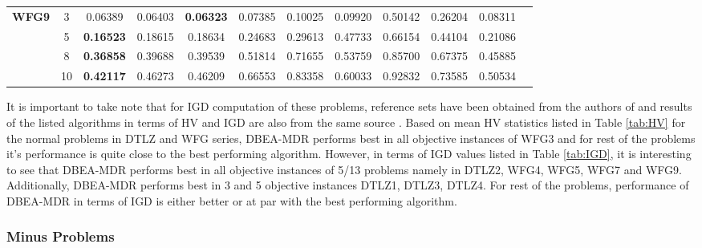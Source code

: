 \documentclass{sig-alternate}
\begin{document}
\begin{table}[!htb]
\begin{tabular}{|c|c|c|c|c|c|c|c|c|c|c|c|}
		\multirow{4}{*}{\textbf{WFG9}}  & 3          & 0.06389          & 0.06403           & \textbf{0.06323}      & 0.07385          & 0.10025             & 0.09920             & 0.50142            & 0.26204              & 0.08311          \\ \cline{2-11} 
		& 5          & \textbf{0.16523} & 0.18615           & 0.18634               & 0.24683          & 0.29613             & 0.47733             & 0.66154            & 0.44104              & 0.21086          \\ \cline{2-11} 
		& 8          & \textbf{0.36858} & 0.39688           & 0.39539               & 0.51814          & 0.71655             & 0.53759             & 0.85700            & 0.67375              & 0.45885          \\ \cline{2-11} 
		& 10         & \textbf{0.42117} & 0.46273           & 0.46209               & 0.66553          & 0.83358             & 0.60033             & 0.92832            & 0.73585              & 0.50534          \\ \hline
	\end{tabular}
\end{table}

It is important to take note that for IGD computation of these problems, reference sets have been obtained from the authors of \cite{ishibuchi2016inverse} and results of the listed algorithms in terms of HV and IGD are also from the same source \cite{ishibuchi2016inverse}. Based on mean HV statistics listed in Table \ref{tab:HV} for the normal problems in DTLZ and WFG series, DBEA-MDR performs best in all objective instances of WFG3 and for rest of the problems it's performance is quite close to the best performing algorithm. However, in terms of IGD values listed in Table \ref{tab:IGD}, it is interesting to see that DBEA-MDR performs best in all objective instances of 5/13 problems namely in DTLZ2, WFG4, WFG5, WFG7 and WFG9. Additionally, DBEA-MDR performs best in 3 and 5 objective instances DTLZ1, DTLZ3, DTLZ4. For rest of the problems, performance of DBEA-MDR in terms of IGD is either better or at par with the best performing algorithm. 

\subsubsection{Minus Problems}
\end{document}
